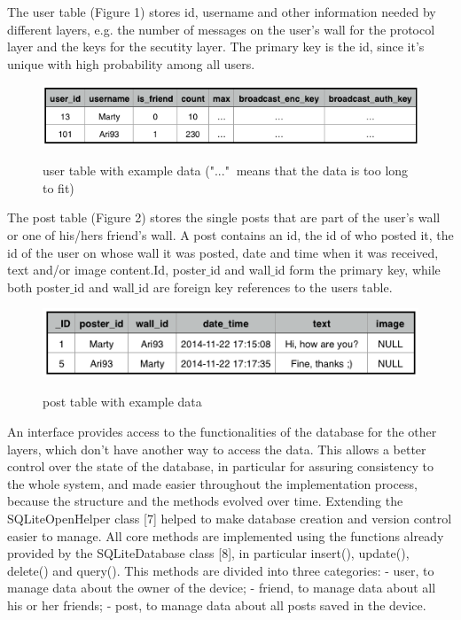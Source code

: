\documentclass{report}
\newcommand{\lfig}[1]{\label{fig:#1}}
\begin{document}
The user table (Figure 1) stores id, username and other information needed by different layers, e.g. the number of messages on the user's wall for the protocol layer and the keys for the secutity layer. The primary key is the id, since it's unique with high probability among all users.

\begin{figure}[H]
	
	
	\centering
    \includegraphics[width=\columnwidth]{users_table_example.png}
    \lfig{users_table_example}
    \vspace{-5mm} %
	\caption{user table with example data ("..."$\:$ means that the data is too long to fit)}
\end{figure}

The post table (Figure 2) stores the single posts that are part of the user's wall or one of his/hers friend's wall. 
A post contains an id, the id of who posted it, the id of the user on whose wall it was posted, date and time when it was received, text and/or image content.Id, poster$\_$id and wall$\_$id form the primary key, while both poster$\_$id and wall$\_$id are foreign key references to the users table.

\begin{figure}[H]
	\centering
    \includegraphics[width=\columnwidth]{post_table_example.png}
    \lfig{post_table_example}
    \vspace{-5mm} %
	\caption{post table with example data}
\end{figure}


An interface provides access to the functionalities of the database for the other layers, which don't have another way to access the data. This allows a better control over the state of the database, in particular for assuring consistency to the whole system, and made easier throughout the implementation process, because the structure and the methods evolved over time.
Extending the SQLiteOpenHelper class [7] helped to make database creation and version control easier to manage.
All core methods are implemented using the functions already provided by the SQLiteDatabase class [8], in particular insert(), update(), delete() and query(). This methods are divided into three categories:
- user, to manage data about the owner of the device;
- friend, to manage data about all his or her friends;
- post, to manage data about all posts saved in the device.
\end{document}

